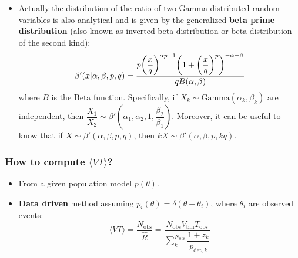 \documentclass[12pt,a4paper]{article}
\begin{document}
\begin{itemize}
    \item Actually the distribution of the ratio of two Gamma distributed random variables is also analytical and is given by the generalized \textbf{beta prime distribution} (also known as inverted beta distribution or beta distribution of the second kind): \begin{equation} \label{eq:betaprime_dist}
        \beta'(x | \alpha, \beta, p, q) = \dfrac{p \qty(\dfrac{x}{q})^{\alpha p - 1} \qty(1 + \qty(\dfrac{x}{q})^{p})^{-\alpha -\beta}}{q B(\alpha, \beta)}
    \end{equation} where \(B\) is the Beta function. Specifically, if \(X_k \sim \mathrm{Gamma}(\alpha_k, \beta_k)\) are independent, then \(\dfrac{X_1}{X_2} \sim \beta'(\alpha_1, \alpha_2, 1, \dfrac{\beta_2}{\beta_1})\). Moreover, it can be useful to know that if \(X \sim \beta'(\alpha, \beta, p, q)\), then \(kX \sim \beta'(\alpha, \beta, p, kq)\).
\end{itemize}

\subsubsection{How to compute \(\langle VT \rangle\)?}
\begin{itemize}
    \item From a given population model \(p(\theta)\).
    \item \textbf{Data driven} method assuming \(p_i(\theta) = \delta(\theta - \theta_i)\), where \(\theta_i\) are observed events: \begin{equation} \label{eq:VT_point}
        \langle VT \rangle = \dfrac{N_\text{obs}}{\hat{R}} = \dfrac{N_\text{obs} V_\text{bin} T_\text{obs}}{\sum_k^{N_\text{obs}} \dfrac{1+z_k}{p_{\text{det}, k}}}
    \end{equation}
\end{itemize}
\end{document}

